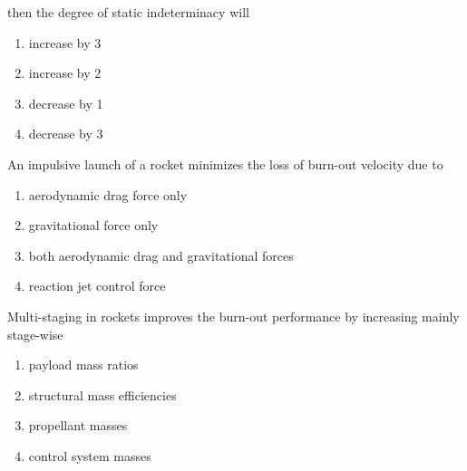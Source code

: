 	then the degree of static indeterminacy will
	\begin{enumerate}
		\item increase by 3
		\item increase by 2
		\item decrease by 1
		\item decrease by 3
	\end{enumerate}
\item An impulsive launch of a rocket minimizes the loss of burn-out velocity due to
	\begin{enumerate}
		\item aerodynamic drag force only
		\item gravitational force only
		\item both aerodynamic drag and gravitational forces
                \item reaction jet control force
        \end{enumerate}
\item Multi-staging in rockets improves the burn-out performance by increasing mainly stage-wise
	\begin{enumerate}
                \item payload mass ratios
                \item structural mass efficiencies
                \item propellant masses
                \item control system masses
        \end{enumerate}
